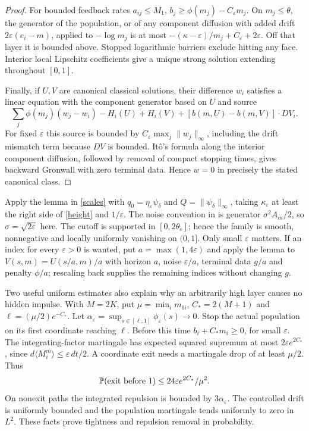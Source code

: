 \documentclass[11pt,a4paper]{article}
\newcommand{\PP}{\mathbb P}
\newcommand{\dt}{\,dt}
\begin{document}
\begin{proof}
For bounded feedback rates $a_{ij}\leq M_1$,
$b_j\geq\phi(m_j)-C_\varepsilon m_j$.
On $m_j\leq\theta$, the generator of the population, or of any
component diffusion with added drift $2\varepsilon(e_i-m)$, applied
to $-\log m_j$ is at most
$-(\kappa-\varepsilon)/m_j+C_\varepsilon+2\varepsilon$.
Off that layer it is bounded above. Stopped logarithmic barriers
exclude hitting any face. Interior local Lipschitz coefficients give
a unique strong solution extending throughout $[0,1]$.

Finally, if $U,V$ are canonical classical solutions, their difference
$w_i$ satisfies a linear equation with the component generator based
on $U$ and source
\[
 \sum_j\phi(m_j)(w_j-w_i)-H_i(U)+H_i(V)
                  +[b(m,U)-b(m,V)]\cdot DV_i.
\]
For fixed $\varepsilon$ this source is bounded by
$C_\varepsilon\max_j\|w_j\|_\infty$, including the drift mismatch
term because $DV$ is bounded. It\^o's formula along the interior
component diffusion, followed by removal of compact stopping times,
gives backward Gronwall with zero terminal data. Hence $w=0$ in
precisely the stated canonical class.
\end{proof}

Apply the lemma in \eqref{scales} with
$q_0=\eta_\varepsilon\psi_\delta$ and
$Q=\|\psi_\delta\|_\infty$, taking $\kappa_\varepsilon$ at least
the right side of \eqref{height} and $1/\varepsilon$.
The noise convention in \cite{BCCD} is generator
$\sigma^2 A_m/2$, so $\sigma=\sqrt{2\varepsilon}$ here.
The cutoff is supported in $[0,2\theta_\varepsilon]$; hence the family
is smooth, nonnegative and locally uniformly vanishing on $(0,1]$.
Only small $\varepsilon$ matters. If an index for every
$\varepsilon>0$ is wanted, put $a=\max(1,4\varepsilon)$ and apply
the lemma to $V(s,m)=U(s/a,m)/a$ with horizon $a$, noise
$\varepsilon/a$, terminal data $g/a$ and penalty $\phi/a$;
rescaling back supplies the remaining indices without changing $g$.

Two useful uniform estimates also explain why an arbitrarily high
layer causes no hidden impulse. With $M=2K$, put
$\mu=\min_i m_{0i}$, $C_*=2(M+1)$ and
$\ell=(\mu/2)e^{-C_*}$. Let
$\alpha_\varepsilon=\sup_{s\in[\ell,1]}\phi_\varepsilon(s)\to0$.
Stop the actual population on its first coordinate reaching $\ell$.
Before this time $b_i+C_*m_i\geq0$, for small $\varepsilon$.
The integrating-factor martingale has expected squared supremum
at most $2\varepsilon e^{2C_*}$, since
$d\langle M_i^m\rangle\leq\varepsilon\dt/2$.
A coordinate exit needs a martingale drop of at least $\mu/2$.
Thus
\begin{equation}\label{globalexit}
 \PP(\hbox{exit before }1)\leq24\varepsilon e^{2C_*}/\mu^2.
\end{equation}
On nonexit paths the integrated repulsion is bounded by
$3\alpha_\varepsilon$. The controlled drift is uniformly bounded
and the population martingale tends uniformly to zero in $L^2$.
These facts prove tightness and repulsion removal in probability.
\end{document}

